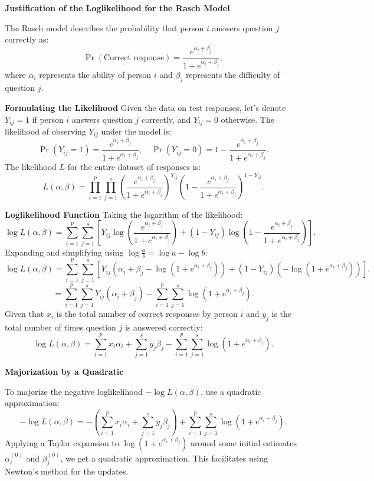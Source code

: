 \documentclass[8pt]{article}
\begin{document}
{\textbf{Justification of the Loglikelihood for the Rasch Model}

The Rasch model describes the probability that person \(i\) answers question \(j\) correctly as:
\[
\Pr(\text{Correct response}) = \frac{e^{\alpha_i + \beta_j}}{1 + e^{\alpha_i + \beta_j}},
\]
where \(\alpha_i\) represents the ability of person \(i\) and \(\beta_j\) represents the difficulty of question \(j\).

\textbf{Formulating the Likelihood}
Given the data on test responses, let's denote \(Y_{ij} = 1\) if person \(i\) answers question \(j\) correctly, and \(Y_{ij} = 0\) otherwise. The likelihood of observing \(Y_{ij}\) under the model is:
\[
\Pr(Y_{ij} = 1) = \frac{e^{\alpha_i + \beta_j}}{1 + e^{\alpha_i + \beta_j}}, \quad \Pr(Y_{ij} = 0) = 1 - \frac{e^{\alpha_i + \beta_j}}{1 + e^{\alpha_i + \beta_j}}.
\]
The likelihood \(L\) for the entire dataset of responses is:
\[
L(\alpha, \beta) = \prod_{i=1}^p \prod_{j=1}^s \left(\frac{e^{\alpha_i + \beta_j}}{1 + e^{\alpha_i + \beta_j}}\right)^{Y_{ij}} \left(1 - \frac{e^{\alpha_i + \beta_j}}{1 + e^{\alpha_i + \beta_j}}\right)^{1 - Y_{ij}}.
\]

\textbf{Loglikelihood Function}
Taking the logarithm of the likelihood:
\[
\log L(\alpha, \beta) = \sum_{i=1}^p \sum_{j=1}^s \left[ Y_{ij} \log \left(\frac{e^{\alpha_i + \beta_j}}{1 + e^{\alpha_i + \beta_j}}\right) + (1 - Y_{ij}) \log \left(1 - \frac{e^{\alpha_i + \beta_j}}{1 + e^{\alpha_i + \beta_j}}\right) \right].
\]
Expanding and simplifying using \(\log \frac{a}{b} = \log a - \log b\):
\[
\log L(\alpha, \beta) = \sum_{i=1}^p \sum_{j=1}^s \left[ Y_{ij} (\alpha_i + \beta_j - \log(1 + e^{\alpha_i + \beta_j})) + (1 - Y_{ij}) (-\log(1 + e^{\alpha_i + \beta_j})) \right].
\]
\[
= \sum_{i=1}^p \sum_{j=1}^s Y_{ij} (\alpha_i + \beta_j) - \sum_{i=1}^p \sum_{j=1}^s \log(1 + e^{\alpha_i + \beta_j}).
\]
Given that \(x_i\) is the total number of correct responses by person \(i\) and \(y_j\) is the total number of times question \(j\) is answered correctly:
\[
\log L(\alpha, \beta) = \sum_{i=1}^p x_i \alpha_i + \sum_{j=1}^s y_j \beta_j - \sum_{i=1}^p \sum_{j=1}^s \log(1 + e^{\alpha_i + \beta_j}).
\]

\textbf{Majorization by a Quadratic}

To majorize the negative loglikelihood \(-\log L(\alpha, \beta)\), use a quadratic approximation:
\[
-\log L(\alpha, \beta) = -\left(\sum_{i=1}^p x_i \alpha_i + \sum_{j=1}^s y_j \beta_j\right) + \sum_{i=1}^p \sum_{j=1}^s \log(1 + e^{\alpha_i + \beta_j}).
\]
Applying a Taylor expansion to \(\log(1 + e^{\alpha_i + \beta_j})\) around some initial estimates \(\alpha_i^{(0)}\) and \(\beta_j^{(0)}\), we get a quadratic approximation. This facilitates using Newton's method for the updates.

}
\end{document}
